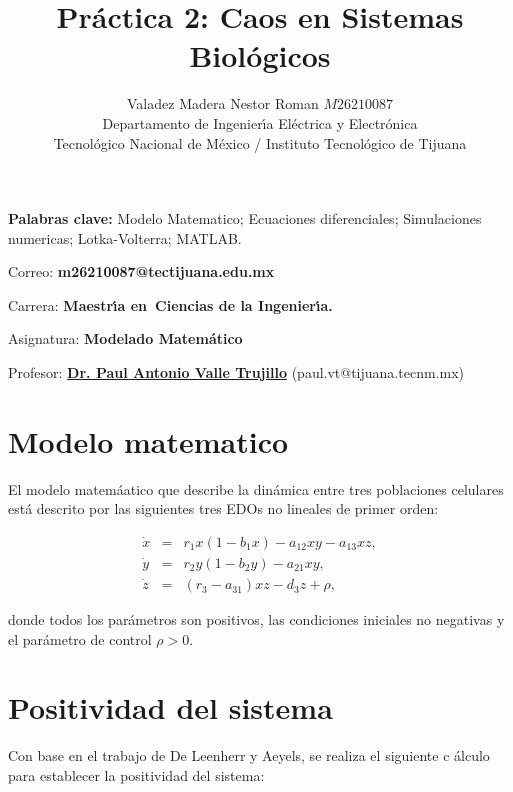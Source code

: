 \documentclass[letterpaper,11pt]{article}
\begin{document}
\title{Pr\'{a}ctica 2: Caos en Sistemas Biol\'{o}gicos}
\author{Valadez Madera Nestor Roman $M26210087$ \\
Departamento de Ingenier\'{\i}a El\'{e}ctrica y Electr\'{o}nica\\
Tecnol\'{o}gico Nacional de M\'{e}xico / Instituto Tecnol\'{o}gico de Tijuana%
}
\maketitle

\noindent \textbf{Palabras clave: }Modelo Matematico; Ecuaciones
diferenciales; Simulaciones numericas; Lotka-Volterra; MATLAB.

\bigskip

\noindent Correo: \textbf{m26210087@tectijuana.edu.mx}

\noindent \noindent Carrera: \textbf{Maestr\'{\i}a en\ Ciencias de la
Ingenier\'{\i}a.}

\noindent Asignatura: \textbf{Modelado Matem\'{a}tico}

\noindent Profesor: \href{https://biomath.xyz/}{\textbf{Dr. Paul Antonio
Valle Trujillo}} (paul.vt@tijuana.tecnm.mx)

\bigskip

\section{Modelo matematico}

\qquad El modelo matem\'{a}atico que describe la din\'{a}mica entre tres
poblaciones celulares est\'{a} descrito por las siguientes tres EDOs no
lineales de primer orden:

\begin{eqnarray*}
\dot{x} &=&r_{1}x(1-b_{1}x)-a_{12}xy-a_{13}xz, \\
\dot{y} &=&r_{2}y(1-b_{2}y)-a_{21}xy, \\
\dot{z} &=&(r_{3}-a_{31})xz-d_{3}z+\rho ,
\end{eqnarray*}

donde todos los par\'{a}metros son positivos, las condiciones iniciales no
negativas y el par\'{a}metro de control $\rho >0$.

\bigskip

\section{Positividad del sistema}

Con base en el trabajo de De Leenherr y Aeyels, se realiza el siguiente c%
\'{a}lculo para establecer la positividad del sistema:
\end{document}
